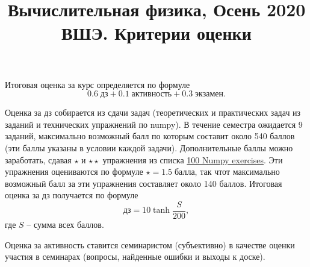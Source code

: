 \documentclass[prb,papersize=a4paper,notitlepage]{revtex4-1}%
\begin{document}
\title{Вычислительная физика, Осень 2020 ВШЭ. Критерии оценки}
\maketitle
Итоговая оценка за курс определяется по формуле $$0.6\;\textrm{дз} + 0.1\;\textrm{активность} + 0.3\;\textrm{экзамен}.$$

Оценка за дз собирается из сдачи задач (теоретических и практических задач из заданий и технических упражнений по numpy). В течение семестра ожидается 9 заданий, максимально возможный балл по которым составит около 540 баллов (эти баллы указаны в условии каждой задачи). Дополнительные баллы можно заработать, сдавая $\star$ и $\star\star$ упражнения из списка \href{https://github.com/rougier/numpy-100/blob/master/100_Numpy_exercises.md}{100 Numpy exercises}. Эти упражнения оцениваются по формуле $\star = 1.5 \;\textrm{балла}$, так чтот максимально возможный балл за эти упражнения составляет около 140 баллов. Итоговая оценка за дз получается по формуле $$\textrm{дз} = 10\tanh\frac{S}{200},$$ где $S$ -- сумма всех баллов.

Оценка за активность ставится семинаристом (субъективно) в качестве оценки участия в семинарах (вопросы, найденные ошибки и выходы к доске).
\end{document}

